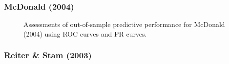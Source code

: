 \subsubsection*{McDonald (2004)}

\begin{figure}
	\centering   
	\caption{Assessments of out-of-sample predictive performance for McDonald (2004) using ROC curves and PR curves.}
\end{figure}
\FloatBarrier

\subsubsection*{Reiter \& Stam (2003)}

